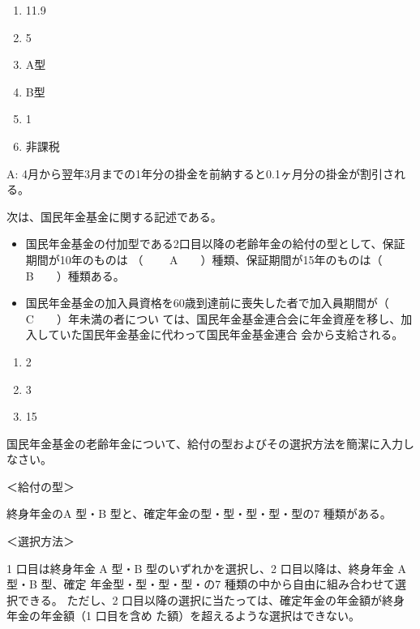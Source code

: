 \begin{answerbox}
  \begin{enumerate}[A: ]
    \item 11.9
    \item 5
    \item A型
    \item B型
    \item 1
    \item 非課税
  \end{enumerate}
\end{answerbox}

\begin{explanationbox}
  A: 4月から翌年3月までの1年分の掛金を前納すると0.1ヶ月分の掛金が割引される。
\end{explanationbox}

\begin{fillblank}[数理人試験 2024 問題1 設問5 C,D,F]
  次は、国民年金基金に関する記述である。
  \begin{itemize}
    \item 国民年金基金の付加型である2口目以降の老齢年金の給付の型として、保証期間が10年のものは
（ 　　A　　）種類、保証期間が15年のものは（　　B　　）種類ある。
\item 国民年金基金の加入員資格を60歳到達前に喪失した者で加入員期間が（　　C　　）年未満の者につい
ては、国民年金基金連合会に年金資産を移し、加入していた国民年金基金に代わって国民年金基金連合
会から支給される。
  \end{itemize}
\end{fillblank}

\begin{answerbox}
\begin{enumerate}[A: ]
  \item 2
  \item 3
  \item 15
\end{enumerate}
\end{answerbox}

\begin{shortanswer}[年金1 2022 問題2(4)ア]
  国民年金基金の老齢年金について、給付の型およびその選択方法を簡潔に入力しなさい。
\end{shortanswer}

\begin{answerbox}
  ＜給付の型＞

終身年金のA 型・B 型と、確定年金の型・型・型・型・型の7 種類がある。

＜選択方法＞

1 口目は終身年金 A 型・B 型のいずれかを選択し、2 口目以降は、終身年金 A 型・B 型、確定
年金型・型・型・型・の7 種類の中から自由に組み合わせて選択できる。
ただし、2 口目以降の選択に当たっては、確定年金の年金額が終身年金の年金額（1 口目を含め
た額）を超えるような選択はできない。
\end{answerbox}

\newpage